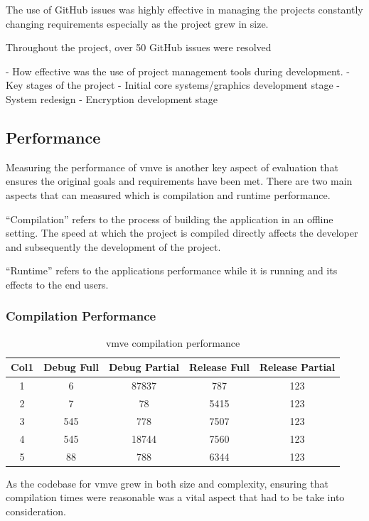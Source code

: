 \documentclass[11pt]{article}
\begin{document}
The use of GitHub issues was highly effective in managing the projects
constantly changing requirements especially as the project grew in size.

Throughout the project, over 50 GitHub issues were resolved 

- How effective was the use of project management tools
during development.
- Key stages of the project
    - Initial core systems/graphics development stage
    - System redesign
    - Encryption development stage

\subsection{Performance}
Measuring the performance of \gls{vmve} is another key aspect of evaluation that
ensures the original goals and requirements have been met. There are two main aspects
that can measured which is compilation and runtime performance.

``Compilation'' refers to the process of building the application in an offline
setting. The speed at which the project is compiled directly affects the
developer and subsequently the development of the project.

``Runtime'' refers to the applications performance while it is running and its
effects to the end users.


\subsubsection{Compilation Performance}

\begin{table}[h!]
\centering
\begin{tabular}{||c c c c c ||} 
  \hline
  Col1 & Debug Full & Debug Partial  & Release Full & Release Partial \\ [0.5ex] 
  \hline\hline
  1 & 6 & 87837 & 787 & 123 \\ 
  2 & 7 & 78 & 5415 & 123 \\
  3 & 545 & 778 & 7507 & 123 \\
  4 & 545 & 18744 & 7560 & 123  \\
  5 & 88 & 788 & 6344 & 123 \\ [1ex] 
  \hline
\end{tabular}
\caption{\gls{vmve} compilation performance}
\label{fig:compilation_performance}
\end{table}

As the codebase for \gls{vmve} grew in both size and complexity, ensuring that
compilation times were reasonable was a vital aspect that had to be take into
consideration.
\end{document}
